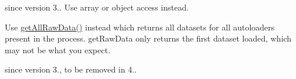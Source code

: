 
\begin{DoxyRefList}
\item[Global \mbox{\hyperlink{class_symfony_1_1_component_1_1_var_dumper_1_1_cloner_1_1_data_ab2fc904496e1d2bc27e61ecd4586d7e8}{Data\+::get\+Raw\+Data}} ()]\label{deprecated__deprecated000003}%
%
since version 3.. Use array or object access instead.  
\item[Global \mbox{\hyperlink{class_composer_1_1_installed_versions_a6ecee8643c03c515b55686f03d117665}{Installed\+Versions\+::get\+Raw\+Data}} ()]\label{deprecated__deprecated000001}%
%
Use \mbox{\hyperlink{class_composer_1_1_installed_versions_a3a09ac4f4e098f4c04c31cfb88a8e256}{get\+All\+Raw\+Data()}} instead which returns all datasets for all autoloaders present in the process. get\+Raw\+Data only returns the first dataset loaded, which may not be what you expect.  
\item[Class \mbox{\hyperlink{class_symfony_1_1_component_1_1_var_dumper_1_1_caster_1_1_mongo_caster}{Mongo\+Caster}} ]\label{deprecated__deprecated000002}%
%
since version 3., to be removed in 4.. 
\end{DoxyRefList}